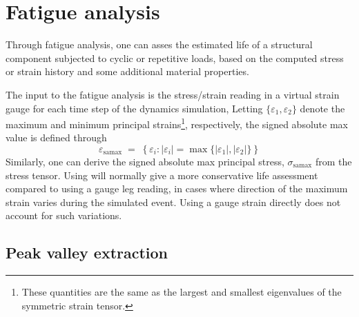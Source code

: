 %
%

%
%

\section{Fatigue analysis}

Through fatigue analysis, one can asses the estimated life of a structural
component subjected to cyclic or repetitive loads, based on the computed
stress or strain history and some additional material properties.

The input to the fatigue analysis is the stress/strain reading in a virtual
strain gauge for each time step of the dynamics simulation,
\iftoggle{publicedition}{%
or alternatively one can compute the
{\em Signed absolute max\/} principal strain from the strain rosette tensor.
}{%
\eqnref{eq:gage strain}, or alternatively one can compute the
{\em Signed absolute max\/} principal strain from the strain rosette tensor
given by \eqnref{eq:rosette strain}.
}%
Letting $\{\varepsilon_1,\varepsilon_2\}$ denote the maximum and minimum
principal strains\footnote{These quantities are the same as the largest and
smallest eigenvalues of the symmetric strain tensor.}, respectively, the
signed absolute max value is defined through
%
\begin{equation}
\label{eq:signed abs max}
\varepsilon_\text{samax} \;=\; \left\{ \varepsilon_i :
|\varepsilon_i| = \max\{|\varepsilon_1|,|\varepsilon_2|\} \right\}
\end{equation}
%
Similarly, one can derive the signed absolute max principal stress,
$\sigma_\text{samax}$ from the stress tensor.
Using  will normally give a more conservative life
assessment compared to using a gauge leg reading, in cases where direction of
the maximum strain varies during the simulated event.
Using a gauge strain directly does not account for such variations.

\subsection{Peak valley extraction}

